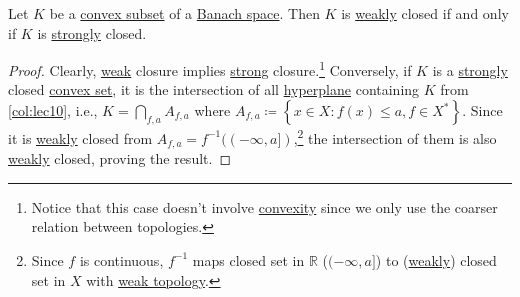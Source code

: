 \begin{proposition}\label{prop:weak-closedness}
	Let \(K\) be a \hyperref[def:convex-set]{convex subset} of a \hyperref[def:Banach-space]{Banach space}. Then \(K\) is \hyperref[def:weak-topology]{weakly} closed if and only if \(K\) is \hyperref[note:strong-topology]{strongly} closed.
\end{proposition}
\begin{proof}
	Clearly, \hyperref[def:weak-topology]{weak} closure implies \hyperref[note:strong-topology]{strong} closure.\footnote{Notice that this case doesn't involve \hyperref[def:convex-set]{convexity} since we only use the coarser relation between topologies.} Conversely, if \(K\) is a \hyperref[note:strong-topology]{strongly} closed \hyperref[def:convex-set]{convex set}, it is the intersection of all \hyperref[def:hyperplane]{hyperplane} containing \(K\) from \autoref{col:lec10}, i.e., \(K = \bigcap_{f, a} A_{f, a}\) where \(A_{f, a}\coloneqq \left\{ x\in X \colon f(x) \leq a, f\in X^{\ast} \right\} \). Since it is \hyperref[def:weak-topology]{weakly} closed from \(A_{f, a}= f^{-1} ((-\infty , a])\),\footnote{Since \(f\) is continuous, \(f^{-1} \) maps closed set in \(\mathbb{R}\) (\((-\infty , a]\)) to (\hyperref[def:weak-topology]{weakly}) closed set in \(X\) with \hyperref[def:weak-topology]{weak topology}.} the intersection of them is also \hyperref[def:weak-topology]{weakly} closed, proving the result.
\end{proof}